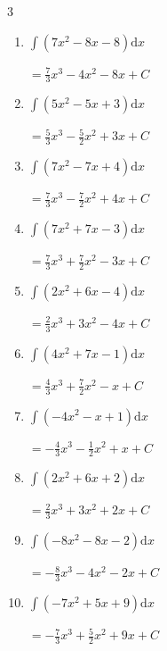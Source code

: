 \begin{multicols}{3}
\begin{enumerate}
        $\displaystyle =-\frac{8}{3}x^{3}+\frac{3}{2}x^{2}+6x+ C$

  \item $\displaystyle \int \left( 7x^{2}-8x-8 \right) \mathrm{d}x$

        $\displaystyle =\frac{7}{3}x^{3}-4x^{2}-8x+ C$

  \item $\displaystyle \int \left( 5x^{2}-5x+3 \right) \mathrm{d}x$

        $\displaystyle =\frac{5}{3}x^{3}-\frac{5}{2}x^{2}+3x+ C$

  \item $\displaystyle \int \left( 7x^{2}-7x+4 \right) \mathrm{d}x$

        $\displaystyle =\frac{7}{3}x^{3}-\frac{7}{2}x^{2}+4x+ C$

  \item $\displaystyle \int \left( 7x^{2}+7x-3 \right) \mathrm{d}x$

        $\displaystyle =\frac{7}{3}x^{3}+\frac{7}{2}x^{2}-3x+ C$

  \item $\displaystyle \int \left( 2x^{2}+6x-4 \right) \mathrm{d}x$

        $\displaystyle =\frac{2}{3}x^{3}+3x^{2}-4x+ C$

\columnbreak %

  \item $\displaystyle \int \left( 4x^{2}+7x-1 \right) \mathrm{d}x$

        $\displaystyle =\frac{4}{3}x^{3}+\frac{7}{2}x^{2}-x+ C$

  \item $\displaystyle \int \left( -4x^{2}-x+1 \right) \mathrm{d}x$

        $\displaystyle =-\frac{4}{3}x^{3}-\frac{1}{2}x^{2}+x+ C$

  \item $\displaystyle \int \left( 2x^{2}+6x+2 \right) \mathrm{d}x$

        $\displaystyle =\frac{2}{3}x^{3}+3x^{2}+2x+ C$

  \item $\displaystyle \int \left( -8x^{2}-8x-2 \right) \mathrm{d}x$

        $\displaystyle =-\frac{8}{3}x^{3}-4x^{2}-2x+ C$

  \item $\displaystyle \int \left( -7x^{2}+5x+9 \right) \mathrm{d}x$

        $\displaystyle =-\frac{7}{3}x^{3}+\frac{5}{2}x^{2}+9x+ C$


\end{enumerate}
\end{multicols}
